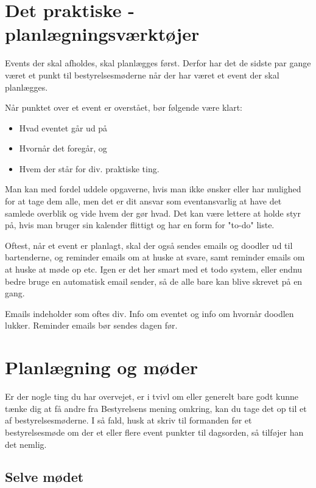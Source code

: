 \section{Det praktiske - planlægningsværktøjer}
\label{sec:det-praktiske}

Events der skal afholdes, skal planlægges først. Derfor har det de
sidste par gange været et punkt til bestyrelsesmøderne når der har
været et event der skal planlægges.

Når punktet over et event er overstået, bør følgende være klart:
\begin{itemize}
\item Hvad eventet går ud på
\item Hvornår det foregår, og
\item Hvem der står for div. praktiske ting.
\end{itemize}

Man kan med fordel uddele opgaverne, hvis man ikke ønsker eller har
mulighed for at tage dem alle, men det er dit ansvar som
eventansvarlig at have det samlede overblik og vide hvem der gør
hvad. Det kan være lettere at holde styr på, hvis man bruger sin
kalender flittigt og har en form for "to-do" liste.

Oftest, når et event er planlagt, skal der også sendes emails og
doodler ud til bartenderne, og reminder emails om at huske at svare,
samt reminder emails om at huske at møde op etc. Igen er det her smart
med et todo system, eller endnu bedre bruge en automatisk email
sender, så de alle bare kan blive skrevet på en gang.

Emails indeholder som oftes div. Info om eventet og info om hvornår
doodlen lukker. Reminder emails bør sendes dagen før.

\section{Planlægning og møder}
\label{sec:planlagning-og-moder}

Er der nogle ting du har overvejet, er i tvivl om eller generelt bare
godt kunne tænke dig at få andre fra Bestyrelsens mening omkring, kan
du tage det op til et af bestyrelsesmøderne. I så fald, husk at skriv
til formanden før et bestyrelsesmøde om der et eller flere event
punkter til dagsorden, så tilføjer han det nemlig.

\subsection{Selve mødet}
\label{sec:selve-modet}


